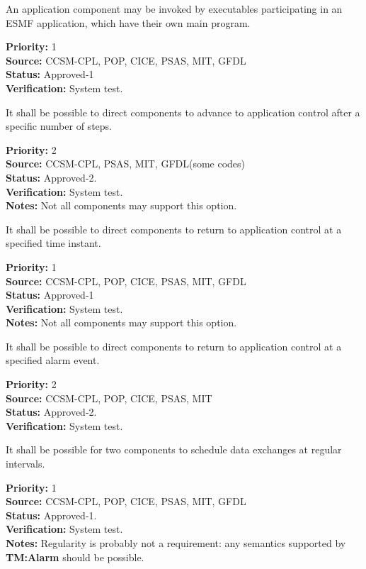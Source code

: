 An application component may be invoked by executables
participating in an ESMF application, which have their own main program.
\begin{reqlist}
{\bf Priority:} 1\\
{\bf Source:} CCSM-CPL, POP, CICE, PSAS, MIT, GFDL \\
{\bf Status:} Approved-1 \\
{\bf Verification:} System test.
\end{reqlist}

 It shall be possible to direct components to
advance to application control after a specific number of steps.
\begin{reqlist}
{\bf Priority:} 2\\
{\bf Source:}  CCSM-CPL, PSAS, MIT, GFDL(some codes) \\
{\bf Status:} Approved-2. \\
{\bf Verification:} System test.\\ 
{\bf Notes:} Not all components may support this option.
\end{reqlist}

 It shall be possible to direct components to return to
application control at a specified time instant.
\begin{reqlist}
{\bf Priority:} 1 \\
{\bf Source:}  CCSM-CPL, POP, CICE, PSAS, MIT, GFDL \\
{\bf Status:} Approved-1\\
{\bf Verification:} System test.\\
{\bf Notes:} Not all components may support this option.
\end{reqlist}

It shall be possible to direct components to return to application
control at a specified alarm event.
\begin{reqlist}
{\bf Priority:} 2 \\
{\bf Source:}  CCSM-CPL, POP, CICE, PSAS, MIT \\
{\bf Status:} Approved-2. \\
{\bf Verification:} System test.
\end{reqlist}

It shall be possible for two components to schedule data exchanges at
regular intervals.

\begin{reqlist}
{\bf Priority:} 1 \\ 
{\bf Source:}  CCSM-CPL, POP, CICE, PSAS, MIT, GFDL \\
{\bf Status:} Approved-1. \\
{\bf Verification:} System test.\\ 
{\bf Notes:}  Regularity is probably not a requirement: any semantics
  supported by \textbf{TM:Alarm} should be possible.
\end{reqlist}

